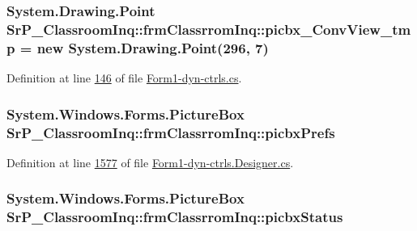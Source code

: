 \hypertarget{class_sr_p___classroom_inq_1_1frm_classrrom_inq_ae49fd425a3c4f52d94af6c20b67f6126}{
\subsubsection[{picbx\-\_\-\-Conv\-View\-\_\-tmp}]{\setlength{\rightskip}{0pt plus 5cm}\-System.\-Drawing.\-Point {\bf \-Sr\-P\-\_\-\-Classroom\-Inq\-::frm\-Classrrom\-Inq\-::picbx\-\_\-\-Conv\-View\-\_\-tmp} = new \-System.\-Drawing.\-Point(296, 7)}}
\label{class_sr_p___classroom_inq_1_1frm_classrrom_inq_ae49fd425a3c4f52d94af6c20b67f6126}


\-Definition at line \hyperlink{_form1-dyn-ctrls_8cs_source_l00146}{146} of file \hyperlink{_form1-dyn-ctrls_8cs_source}{\-Form1-\/dyn-\/ctrls.\-cs}.

\hypertarget{class_sr_p___classroom_inq_1_1frm_classrrom_inq_ad71fe1b1dd90eb59594ecf4a175e1b03}{
\subsubsection[{picbx\-Prefs}]{\setlength{\rightskip}{0pt plus 5cm}\-System.\-Windows.\-Forms.\-Picture\-Box {\bf \-Sr\-P\-\_\-\-Classroom\-Inq\-::frm\-Classrrom\-Inq\-::picbx\-Prefs}}}
\label{class_sr_p___classroom_inq_1_1frm_classrrom_inq_ad71fe1b1dd90eb59594ecf4a175e1b03}


\-Definition at line \hyperlink{_form1-dyn-ctrls_8_designer_8cs_source_l01577}{1577} of file \hyperlink{_form1-dyn-ctrls_8_designer_8cs_source}{\-Form1-\/dyn-\/ctrls.\-Designer.\-cs}.

\hypertarget{class_sr_p___classroom_inq_1_1frm_classrrom_inq_a5252272b4880f9a8d5ecf8fcd1828873}{
\subsubsection[{picbx\-Status}]{\setlength{\rightskip}{0pt plus 5cm}\-System.\-Windows.\-Forms.\-Picture\-Box {\bf \-Sr\-P\-\_\-\-Classroom\-Inq\-::frm\-Classrrom\-Inq\-::picbx\-Status}}}
\label{class_sr_p___classroom_inq_1_1frm_classrrom_inq_a5252272b4880f9a8d5ecf8fcd1828873}


